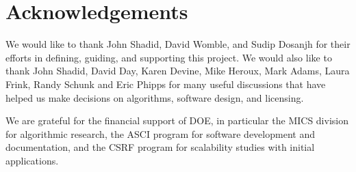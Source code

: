 \chapter*{Acknowledgements}

We would like to thank John Shadid, David Womble, and Sudip Dosanjh for their efforts in defining, guiding, and supporting this project. We would also like to thank John Shadid, David Day, Karen Devine, Mike Heroux, Mark Adams, Laura Frink, Randy Schunk and Eric Phipps for many useful discussions that have helped us make decisions on algorithms, software design, and licensing.

We are grateful for the financial support of DOE, in particular the MICS division for algorithmic research, the ASCI program for software development and documentation, and the CSRF program for scalability studies with initial applications. 
